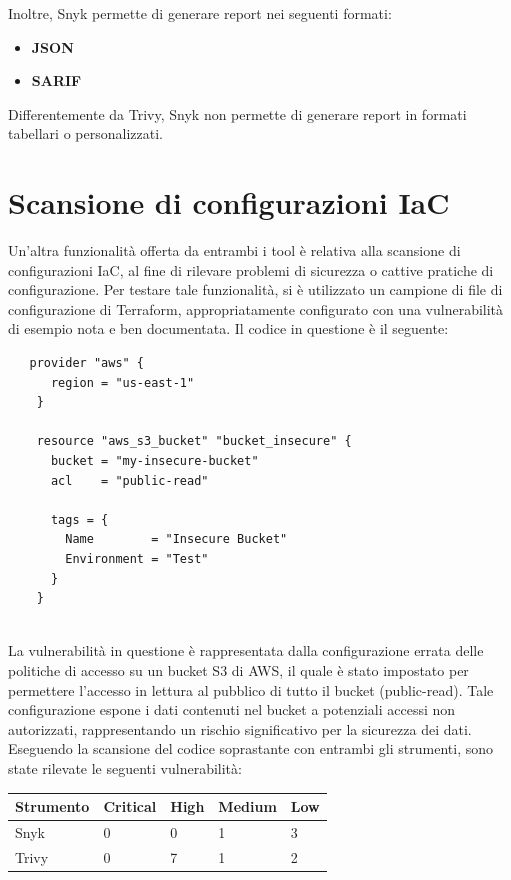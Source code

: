 Inoltre, Snyk permette di generare report nei seguenti formati:
\begin{itemize}
   \item\textbf{JSON}
   \item\textbf{SARIF}
\end{itemize}

Differentemente da Trivy, Snyk non permette di generare report in formati tabellari o personalizzati.

\section{Scansione di configurazioni IaC}
Un'altra funzionalità offerta da entrambi i tool è relativa alla scansione di configurazioni IaC, al fine di rilevare problemi di sicurezza o cattive pratiche di configurazione. Per testare tale funzionalità, si è utilizzato un campione di file di configurazione di Terraform, appropriatamente configurato con una vulnerabilità di esempio nota e ben documentata. Il codice in questione è il seguente:
\begin{lstlisting}
   provider "aws" {
      region = "us-east-1"
    }
    
    resource "aws_s3_bucket" "bucket_insecure" {
      bucket = "my-insecure-bucket"
      acl    = "public-read"
    
      tags = {
        Name        = "Insecure Bucket"
        Environment = "Test"
      }
    }
    
\end{lstlisting}


La vulnerabilità in questione è rappresentata dalla configurazione errata delle politiche di accesso su un bucket S3 di AWS, il quale è stato impostato per permettere l'accesso in lettura al pubblico di tutto il bucket (public-read). Tale configurazione espone i dati contenuti nel bucket a potenziali accessi non autorizzati, rappresentando un rischio significativo per la sicurezza dei dati.
Eseguendo la scansione del codice soprastante con entrambi gli strumenti, sono state rilevate le seguenti vulnerabilità:

\begin{center}
   \begin{tabularx}{0.8\textwidth}{|X|X|X|X|X|}
      \hline
      \textbf{Strumento} & \textbf{Critical} & \textbf{High} & \textbf{Medium} & \textbf{Low} \\
      \hline
      Snyk               & 0                 & 0             & 1               & 3            \\
      \hline
      Trivy              & 0                 & 7             & 1               & 2            \\
      \hline
   \end{tabularx}
\end{center}

